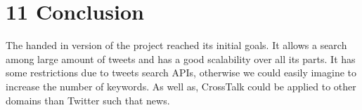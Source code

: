 \chapter*{11    Conclusion}
\setcounter{chapter}{11}
\setcounter{section}{0}

The handed in version of the project reached its initial goals. It allows a search among large amount of tweets and has a good scalability over all its parts. It has some restrictions due to tweets search APIs, otherwise we could easily imagine to increase the number of keywords. As well as, CrossTalk could be applied to other domains than Twitter such that news.